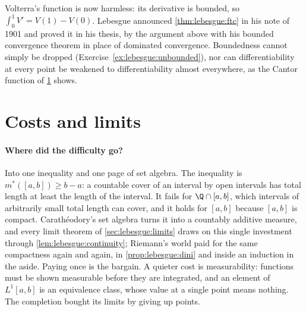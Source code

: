 \begin{refsection}
Volterra's function is now harmless: its derivative is bounded, so $\int_0^1V'=V(1)-V(0)$. Lebesgue announced \cref{thm:lebesgue:ftc} in his note of 1901 and proved it in his thesis, by the argument above with his bounded convergence theorem in place of dominated convergence. Boundedness cannot simply be dropped (Exercise~\ref{ex:lebesgue:unbounded}), nor can differentiability at every point be weakened to differentiability almost everywhere, as the Cantor function of \cref{sec:lebesgue:costs} shows.

\section{Costs and limits}\label{sec:lebesgue:costs}

\paragraph{Where did the difficulty go?} Into one inequality and one page of set algebra. The inequality is $m^*([a,b])\ge b-a$: a countable cover of an interval by open intervals has total length at least the length of the interval. It fails for $\Q\cap[a,b]$, which intervals of arbitrarily small total length can cover, and it holds for $[a,b]$ because $[a,b]$ is compact. Carathéodory's set algebra turns it into a countably additive measure, and every limit theorem of \cref{sec:lebesgue:limits} draws on this single investment through \cref{lem:lebesgue:continuity}; Riemann's world paid for the same compactness again and again, in \cref{prop:lebesgue:dini} and inside an induction in the aside. Paying once is the bargain. A quieter cost is measurability: functions must be shown measurable before they are integrated, and an element of $L^1[a,b]$ is an equivalence class, whose value at a single point means nothing. The completion bought its limits by giving up points.


\end{refsection}
